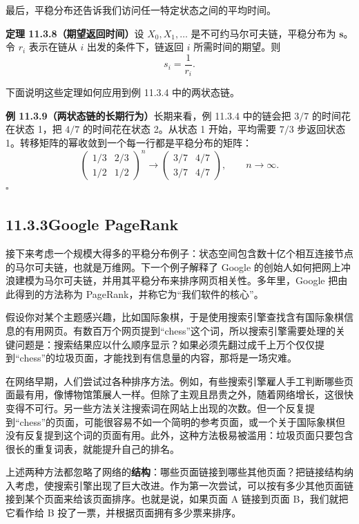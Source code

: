 \documentclass[UTF8,12pt,a4paper,fontset=fandol]{ctexart}
\begin{document}
最后，平稳分布还告诉我们访问任一特定状态之间的平均时间。

\noindent\textbf{定理 11.3.8（期望返回时间）}\quad 设 $X_0,X_1,\ldots$ 是不可约马尔可夫链，平稳分布为 $\mathbf s$。令 $r_i$ 表示在链从 $i$ 出发的条件下，链返回 $i$ 所需时间的期望。则
\[
  s_i=\frac{1}{r_i}.
\]

下面说明这些定理如何应用到例 11.3.4 中的两状态链。

\noindent\textbf{例 11.3.9（两状态链的长期行为）}\quad 长期来看，例 11.3.4 中的链会把 $3/7$ 的时间花在状态 1，把 $4/7$ 的时间花在状态 2。从状态 1 开始，平均需要 $7/3$ 步返回状态 1。转移矩阵的幂收敛到一个每一行都是平稳分布的矩阵：
\[
  \begin{pmatrix}
    1/3 & 2/3\\
    1/2 & 1/2
  \end{pmatrix}^n
  \to
  \begin{pmatrix}
    3/7 & 4/7\\
    3/7 & 4/7
  \end{pmatrix},
  \qquad n\to\infty.
\]
$\square$

\subsection*{11.3.3\quad Google PageRank}

接下来考虑一个规模大得多的平稳分布例子：状态空间包含数十亿个相互连接节点的马尔可夫链，也就是万维网。下一个例子解释了 Google 的创始人如何把网上冲浪建模为马尔可夫链，并用其平稳分布来排序网页相关性。多年里，Google 把由此得到的方法称为 PageRank，并称它为“我们软件的核心”。

假设你对某个主题感兴趣，比如国际象棋，于是使用搜索引擎查找含有国际象棋信息的有用网页。有数百万个网页提到“chess”这个词，所以搜索引擎需要处理的关键问题是：搜索结果应以什么顺序显示？如果必须先翻过成千上万个仅仅提到“chess”的垃圾页面，才能找到有信息量的内容，那将是一场灾难。

在网络早期，人们尝试过各种排序方法。例如，有些搜索引擎雇人手工判断哪些页面最有用，像博物馆策展人一样。但除了主观且昂贵之外，随着网络增长，这很快变得不可行。另一些方法关注搜索词在网站上出现的次数。但一个反复提到“chess”的页面，可能很容易不如一个简明的参考页面，或一个关于国际象棋但没有反复提到这个词的页面有用。此外，这种方法极易被滥用：垃圾页面只要包含很长的重复词表，就能提升自己的排名。

上述两种方法都忽略了网络的\textbf{结构}：哪些页面链接到哪些其他页面？把链接结构纳入考虑，使搜索引擎出现了巨大改进。作为第一次尝试，可以按有多少其他页面链接到某个页面来给该页面排序。也就是说，如果页面 A 链接到页面 B，我们就把它看作给 B 投了一票，并根据页面拥有多少票来排序。
\end{document}

